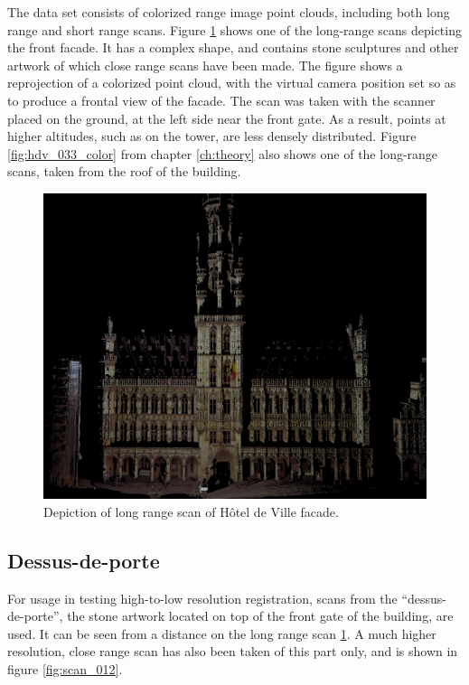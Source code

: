 The data set consists of colorized range image point clouds, including both long range and short range scans. Figure \ref{fig:scan_005} shows one of the long-range scans depicting the front facade. It has a complex shape, and contains stone sculptures and other artwork of which close range scans have been made. The figure shows a reprojection of a colorized point cloud, with the virtual camera position set so as to produce a frontal view of the facade. The scan was taken with the scanner placed on the ground, at the left side near the front gate. As a result, points at higher altitudes, such as on the tower, are less densely distributed. Figure \ref{fig:hdv_033_color} from chapter \ref{ch:theory} also shows one of the long-range scans, taken from the roof of the building.

\begin{figure}[h]
\centering
\includegraphics[width=\textwidth]{fig/scan_005.png}
\caption{Depiction of long range scan of Hôtel de Ville facade.}
\label{fig:scan_005}
\end{figure}


\subsection{Dessus-de-porte}
For usage in testing high-to-low resolution registration, scans from the ``dessus-de-porte'', the stone artwork located on top of the front gate of the building, are used. It can be seen from a distance on the long range scan \ref{fig:scan_005}. A much higher resolution, close range scan has also been taken of this part only, and is shown in figure \ref{fig:scan_012}.

